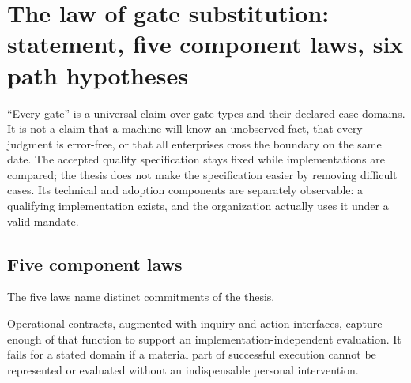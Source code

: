 \section{The law of gate substitution: statement, five component laws, six path hypotheses}
\label{sec:law}

\noindent{}

\medskip
``Every gate'' is a universal claim over gate types and their declared case domains. It is not a claim
that a machine will know an unobserved fact, that every judgment is error-free, or that all enterprises
cross the boundary on the same date. The accepted quality specification stays fixed while
implementations are compared; the thesis does not make the specification easier by removing difficult
cases. Its technical and adoption components are separately observable: a qualifying implementation
exists, and the organization actually uses it under a valid mandate.

\subsection{Five component laws}

The five laws name distinct commitments of the thesis.

 Operational contracts, augmented with
inquiry and action interfaces, capture enough of that function to support an implementation-independent
evaluation. It fails for a stated domain if a material part of successful execution cannot be
represented or evaluated without an indispensable personal intervention.

